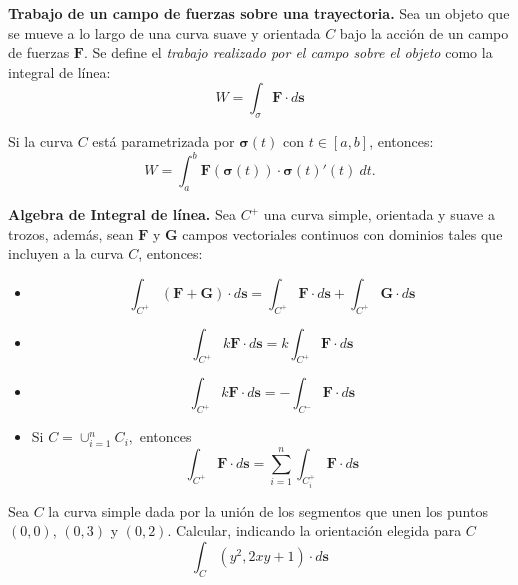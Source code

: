 \begin{definition} \textbf{Trabajo de un campo de fuerzas sobre una trayectoria.}
Sea un objeto que se mueve a lo largo de una curva suave y orientada $C$ bajo la acci\'on de un campo de fuerzas $\mathbf{F}$. 
Se define el     \emph{trabajo realizado por el campo sobre el objeto} como la integral de línea:
\[
W = \int_{\sigma}\mathbf{F}\cdot d\mathbf{s}
\]

Si la curva $C$ está parametrizada por $\boldsymbol{\sigma}(t)$ con $t \in [a,b]$, entonces:
\[
W = \int_a^b \mathbf{F}(\boldsymbol{\sigma}(t)) \cdot \boldsymbol{\sigma}(t)'(t) \: dt.
\]
\end{definition}





  \begin{propertie} \textbf{Algebra de Integral de l\'inea.}\label{alge} Sea $C^{+}$ una curva simple, orientada y suave a trozos, adem\'as,  sean  $\mathbf{F}$ y $\mathbf{G}$ campos vectoriales continuos con dominios tales que incluyen a la curva $C$, entonces: 
\begin{itemize}
\item[1.]  \[
        \int_{C^{+}}(\mathbf{F} + \mathbf{G})  \cdot d\mathbf{s}=  \int_{C^{+}} \mathbf{F} \cdot d\mathbf{s}  +  \int_{C^{+}} \mathbf{G}  \cdot d\mathbf{s} 
    \]

\item[2.]  \[
        \int_{C^{+}} k \mathbf{F}  \cdot d\mathbf{s}= k \int_{C^{+}} \mathbf{F} \cdot d\mathbf{s}   
    \]

\item[3.]  \[
        \int_{C^{+}} k \mathbf{F}  \cdot d\mathbf{s}= - \int_{C^{-}} \mathbf{F} \cdot d\mathbf{s}   
    \]

\item[3.]  Si $C = \cup_{i=1}^{n} C_{i},$ entonces \[
        \int_{C^{+}}  \mathbf{F}  \cdot d\mathbf{s}=  \sum_{i=1}^{n}  \int_{C_{i}^{+}} \mathbf{F} \cdot d\mathbf{s}   
    \]

\end{itemize}
 \end{propertie}



 \begin{tarea} Sea $C$ la curva simple dada por la uni\'on de los segmentos que unen los puntos $(0,0)$,  $(0,3)$ y $(0,2)$. Calcular, indicando la orientaci\'on elegida para $C$  $$ \int_{C}  (y^{2}, 2xy +1)  \cdot d\mathbf{s} $$
 \end{tarea}


